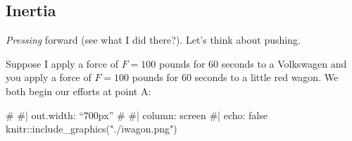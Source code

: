 \documentclass[
  letterpaper,
  DIV=11,
  numbers=noendperiod,
  oneside]{scrreprt}
\newenvironment{Shaded}{\begin{snugshade}}{\end{snugshade}}
\newcommand{\CommentTok}[1]{\textcolor[rgb]{0.37,0.37,0.37}{#1}}
\newcommand{\FunctionTok}[1]{\textcolor[rgb]{0.28,0.35,0.67}{#1}}
\newcommand{\NormalTok}[1]{\textcolor[rgb]{0.00,0.23,0.31}{#1}}
\newcommand{\SpecialCharTok}[1]{\textcolor[rgb]{0.37,0.37,0.37}{#1}}
\newcommand{\StringTok}[1]{\textcolor[rgb]{0.13,0.47,0.30}{#1}}
\begin{document}
\subsection{Inertia}\label{inertia}

\emph{Pressing} forward (see what I did there?). Let's think about
pushing.

Suppose I apply a force of \(F=100\) pounds for 60 seconds to a
Volkswagen and you apply a force of \(F=100\) pounds for 60 seconds to a
little red wagon. We both begin our efforts at point A:

\begin{Shaded}
\begin{Highlighting}[]
\CommentTok{\# \#| out.width: “700px”  }
\CommentTok{\# \#| column: screen}
\CommentTok{\#| echo: false}
\NormalTok{knitr}\SpecialCharTok{::}\FunctionTok{include\_graphics}\NormalTok{(}\StringTok{"./iwagon.png"}\NormalTok{)}
\end{Highlighting}
\end{Shaded}

{
\makeatletter
\def\LT@makecaption#1#2#3{%
  \noalign{\smash{\hbox{\kern\textwidth\rlap{\kern\marginparsep
  \parbox[t]{\marginparwidth}{%
    \footnotesize{%
      \vspace{(1.1\baselineskip)}
    #1{#2: }\ignorespaces #3}}}}}}%
    }
\makeatother

\begin{figure}[H]



\end{figure}%

}
\end{document}
